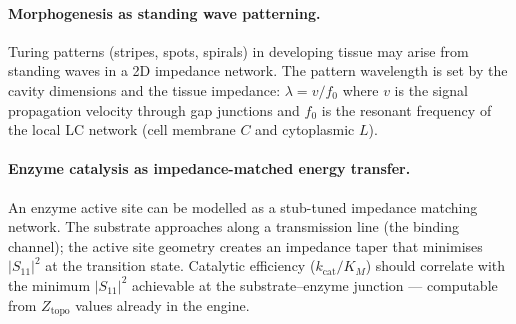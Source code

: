\paragraph{Morphogenesis as standing wave patterning.}
Turing patterns (stripes, spots, spirals) in developing tissue
may arise from standing waves in a 2D impedance network.  The
pattern wavelength is set by the cavity dimensions and the
tissue impedance: $\lambda = v/f_0$ where $v$ is the
signal propagation velocity through gap junctions and
$f_0$ is the resonant frequency of the local LC network
(cell membrane $C$ and cytoplasmic $L$).

\paragraph{Enzyme catalysis as impedance-matched energy transfer.}
An enzyme active site can be modelled as a stub-tuned
impedance matching network.  The substrate approaches along a
transmission line (the binding channel); the active site
geometry creates an impedance taper that minimises $|S_{11}|^2$
at the transition state.  Catalytic efficiency ($k_\text{cat}/K_M$)
should correlate with the minimum $|S_{11}|^2$ achievable at
the substrate--enzyme junction --- computable from
$Z_\text{topo}$ values already in the engine.
